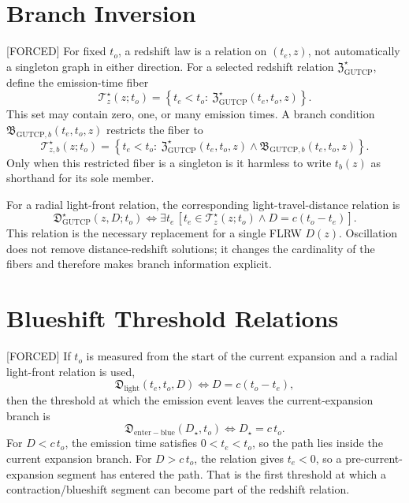 \documentclass[11pt]{article}
\newcommand{\ZRel}{\mathfrak{Z}_{\mathrm{GUTCP}}}
\newcommand{\DRel}{\mathfrak{D}_{\mathrm{GUTCP}}}
\begin{document}
\section*{Branch Inversion}

[FORCED] For fixed \(t_o\), a redshift law is a relation on
\((t_e,z)\), not automatically a singleton graph in either direction.  For a selected
redshift relation \(\ZRel^\star\), define the emission-time fiber
\begin{equation}
\mathcal{T}_{z}^{\star}(z;t_o)=
\left\{t_e<t_o:\ \ZRel^\star(t_e,t_o,z)\right\}.
\label{eq:emission-time-fiber}
\end{equation}
This set may contain zero, one, or many emission times.  A branch condition
\(\mathfrak{B}_{\mathrm{GUTCP},b}(t_e,t_o,z)\) restricts the fiber to
\begin{equation}
\mathcal{T}_{z,b}^{\star}(z;t_o)=
\left\{t_e<t_o:\ \ZRel^\star(t_e,t_o,z)\wedge
\mathfrak{B}_{\mathrm{GUTCP},b}(t_e,t_o,z)\right\}.
\label{eq:branch-restricted-fiber}
\end{equation}
Only when this restricted fiber is a singleton is it harmless to write
\(t_b(z)\) as shorthand for its sole member.

For a radial light-front relation, the corresponding light-travel-distance
relation is
\begin{equation}
\DRel^\star(z,D;t_o)
\Longleftrightarrow
\exists t_e\,
\left[
t_e\in\mathcal{T}_{z}^{\star}(z;t_o)
\wedge D=c(t_o-t_e)
\right].
\label{eq:light-distance-relation}
\end{equation}
This relation is the necessary replacement for a single FLRW \(D(z)\).
Oscillation does not remove distance-redshift solutions; it changes the
cardinality of the fibers and therefore makes branch information explicit.

\section*{Blueshift Threshold Relations}

[FORCED] If \(t_o\) is measured from the start of the current expansion and a
radial light-front relation is used,
\begin{equation}
\mathfrak{D}_{\mathrm{light}}(t_e,t_o,D)
\Longleftrightarrow
D=c(t_o-t_e),
\label{eq:radial-light-distance}
\end{equation}
then the threshold at which the emission event leaves the current-expansion
branch is
\begin{equation}
\mathfrak{D}_{\mathrm{enter-blue}}(D_\star,t_o)
\Longleftrightarrow
D_\star=c\,t_o.
\label{eq:blue-segment-entry-threshold}
\end{equation}
For \(D<c\,t_o\), the emission time satisfies \(0<t_e<t_o\), so the path lies
inside the current expansion branch.  For \(D>c\,t_o\), the relation gives
\(t_e<0\), so a pre-current-expansion segment has entered the path.  That is
the first threshold at which a contraction/blueshift segment can become part
of the redshift relation.
\end{document}
